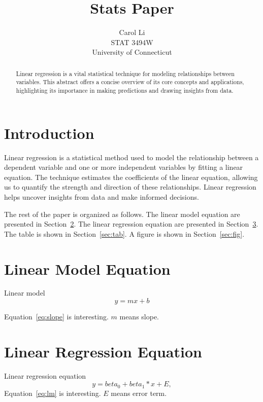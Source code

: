 \documentclass[12pt]{article}
\title{Stats Paper}
\author{Carol Li\\
    STAT 3494W\\
    University of Connecticut
}
\begin{document}

\begin{abstract}
  Linear regression is a vital statistical technique for modeling relationships between variables. 
  This abstract offers a concise overview of its core concepts and applications, highlighting its importance 
  in making predictions and drawing insights from data.
\end{abstract}


\section{Introduction}
\label{sec:intro}

Linear regression is a statistical method used to model the relationship between a dependent variable and 
one or more independent variables by fitting a linear equation. The technique estimates the coefficients of the linear 
equation, allowing us to quantify the strength and direction of these relationships. Linear regression helps uncover 
insights from data and make informed decisions.

\lipsum[1]


The rest of the paper is organized as follows.
The linear model equation are presented in Section~\ref{sec:eq}.
The linear regression equation are presented in Section~\ref{sec:eq2}.
The table is shown in Section~\ref{sec:tab}.
A figure is shown in Section~\ref{sec:fig}.


\section{Linear Model Equation}
\label{sec:eq}

Linear model
\begin{equation}
  \label{eq:slope}
  y = mx + b
\end{equation}

Equation~\eqref{eq:slope} is interesting. $m$ means slope.  

\section{Linear Regression Equation}
\label{sec:eq2}

Linear regression equation
\begin{equation}
  \label{eq:lm}
  y = beta_0 + beta_1*x + E,
\end{equation}
Equation~\eqref{eq:lm} is interesting. $E$ means error term.  
\end{document}
